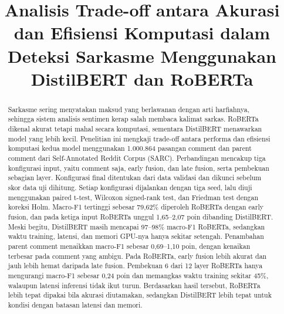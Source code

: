 \documentclass[conference]{IEEEtran}
\begin{document}
\title{Analisis Trade-off antara Akurasi dan Efisiensi Komputasi dalam Deteksi Sarkasme Menggunakan DistilBERT dan RoBERTa}

\author{
\and
{}
}

\maketitle

\begin{abstract}
Sarkasme sering menyatakan maksud yang berlawanan dengan arti harfiahnya, sehingga sistem analisis sentimen kerap salah membaca kalimat sarkas. RoBERTa dikenal akurat tetapi mahal secara komputasi, sementara DistilBERT menawarkan model yang lebih kecil. Penelitian ini mengkaji trade-off antara performa dan efisiensi komputasi kedua model menggunakan 1.000.864 pasangan comment dan parent comment dari Self-Annotated Reddit Corpus (SARC). Perbandingan mencakup tiga konfigurasi input, yaitu comment saja, early fusion, dan late fusion, serta pembekuan sebagian layer. Konfigurasi final ditentukan dari data validasi dan dikunci sebelum skor data uji dihitung. Setiap konfigurasi dijalankan dengan tiga seed, lalu diuji menggunakan paired t-test, Wilcoxon signed-rank test, dan Friedman test dengan koreksi Holm. Macro-F1 tertinggi sebesar 79,62\% diperoleh RoBERTa dengan early fusion, dan pada ketiga input RoBERTa unggul 1,65--2,07 poin dibanding DistilBERT. Meski begitu, DistilBERT masih mencapai 97--98\% macro-F1 RoBERTa, sedangkan waktu training, latensi, dan memori GPU-nya hanya sekitar setengah. Penambahan parent comment menaikkan macro-F1 sebesar 0,69--1,10 poin, dengan kenaikan terbesar pada comment yang ambigu. Pada RoBERTa, early fusion lebih akurat dan jauh lebih hemat daripada late fusion. Pembekuan 6 dari 12 layer RoBERTa hanya mengurangi macro-F1 sebesar 0,24 poin dan memangkas waktu training sekitar 45\%, walaupun latensi inferensi tidak ikut turun. Berdasarkan hasil tersebut, RoBERTa lebih tepat dipakai bila akurasi diutamakan, sedangkan DistilBERT lebih tepat untuk kondisi dengan batasan latensi dan memori.
\end{abstract}
\end{document}
